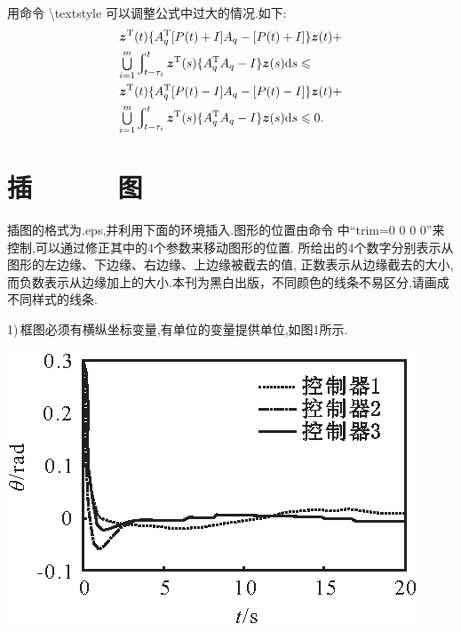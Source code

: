 \documentclass{ctacn}%
\begin{document}
\begin{multicols}{2}
用命令 \textbackslash textstyle 可以调整公式中过大的情况.\;如下:
\begin{align}
&{\bm z}^{\rm T}(t)\{A_q^{\rm T}[P(t)+I]A_q-[P(t)+I]\}{\bm z}(t)+ \notag\\
&{\textstyle\bigcup\limits_{i=1}^m}\varint\nolimits_{t-\tau_i}^t{\bm
	z}^{\rm T}(s)\{A_q^{\rm T}A_q-I\}{\bm z}(s){\rm d}s\leqslant \notag\\
&{\bm z}^{\rm T}(t)\{A_q^{\rm T}[P(t)-I]A_q-[P(t)-I]\}{\bm z}(t)+ \notag\\
&{\textstyle\bigcup\limits_{i=1}^m}\varint\nolimits_{t-\tau_i}^t{\bm
	z}^{\rm T}(s)\{A_q^{\rm T}A_q-I\}{\bm z}(s){\rm d}s\leqslant 0.
\end{align}

\section{插~~~~~~图}

插图的格式为.eps,并利用下面的环境插入.图形的位置由命令
中“trim=0 0 0 0”来控制,可以通过修正其中的4个参数来移动图形的位置.
所给出的4个数字分别表示从图形的左边缘、下边缘、右边缘、上边缘被截去的值,
正数表示从边缘截去的大小, 而负数表示从边缘加上的大小.\;本刊为黑白出版，不同颜色的线条不易区分,请画成不同样式的线条.

1)\,框图必须有横纵坐标变量,有单位的变量提供单位,如图1所示.
\begin{center}
	\includegraphics[scale=1,trim=0 0 0 0]{template-1}\\
	\label{Fig1}
\end{center}


\end{multicols}
\end{document}
